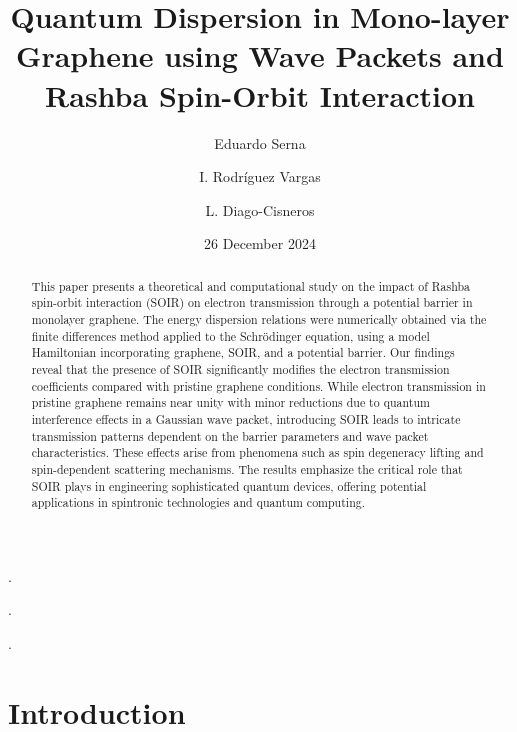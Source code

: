 \documentclass[twocolumn, aps, prb, 10pt]{revtex4-2}
\begin{document}
    \title{Quantum Dispersion in Mono-layer Graphene using Wave Packets and Rashba Spin-Orbit Interaction}
    \author{Eduardo Serna}
    .
    \author{I. Rodríguez Vargas}
    .
    \author{L. Diago-Cisneros}
    .
    \date{26 December 2024}


    \begin{abstract}
        This paper presents a theoretical and computational study on the impact of Rashba spin-orbit interaction (SOIR) on electron transmission through a potential barrier in monolayer graphene.
        The energy dispersion relations were numerically obtained via the finite differences method applied to the Schrödinger equation, using a model Hamiltonian incorporating graphene, SOIR, and a potential barrier.
        Our findings reveal that the presence of SOIR significantly modifies the electron transmission coefficients compared with pristine graphene conditions.
        While electron transmission in pristine graphene remains near unity with minor reductions due to quantum interference effects in a Gaussian wave packet, introducing SOIR leads to intricate transmission patterns dependent on the barrier parameters and wave packet characteristics.
        These effects arise from phenomena such as spin degeneracy lifting and spin-dependent scattering mechanisms.
        The results emphasize the critical role that SOIR plays in engineering sophisticated quantum devices, offering potential applications in spintronic technologies and quantum computing.
    \end{abstract}

    \maketitle




    \section{Introduction}\label{sec:introduction}
    
\end{document}
